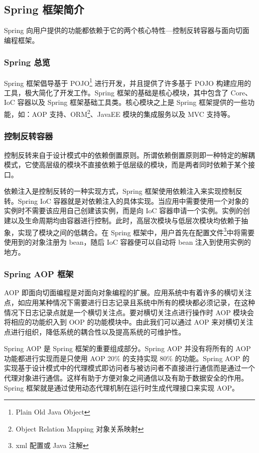 \documentclass[a4paper, 12pt, UTF8]{ctexart}
\begin{document}
	\subsection{Spring 框架简介}
	
	Spring 向用户提供的功能都依赖于它的两个核心特性---控制反转容器与面向切面编程框架。
	
	\subsubsection{Spring 总览}
	Spring 框架倡导基于 POJO\footnote{Plain Old Java Object} 进行开发，并且提供了许多基于 POJO 构建应用的工具，极大简化了开发工作。Spring 框架的基础是核心模块，其中包含了 Core、IoC 容器以及 Spring 框架基础工具类。核心模块之上是 Spring 框架提供的一些功能，如：AOP 支持、ORM\footnote{Object Relation Mapping 对象关系映射}、JavaEE 模块的集成服务以及 MVC 支持等\cite{王福强2009}。
	
	\subsubsection{控制反转容器}
	控制反转来自于设计模式中的依赖倒置原则。所谓依赖倒置原则即一种特定的解耦模式，它使高层级的模块不直接依赖于低层级的模块，而是两者同时依赖于某个接口\cite{Gamma2007}。
	
	依赖注入是控制反转的一种实现方式，Spring 框架使用依赖注入来实现控制反转。Spring IoC 容器就是对依赖注入的具体实现。当应用中需要使用一个对象的实例时不需要该应用自己创建该实例，而是向 IoC 容器申请一个实例。实例的创建以及生命周期均由容器进行控制。此时，高层次模块与低层次模块均依赖于抽象，实现了模块之间的低耦合\cite{Spring2018}。在 Spring 框架中，用户首先在配置文件\footnote{xml 配置或 Java 注解}中将需要使用到的对象注册为 bean，随后 IoC 容器便可以自动将 bean 注入到使用实例的地方。
	
	\subsubsection{Spring AOP 框架}
	AOP 即面向切面编程是对面向对象编程的扩展。应用系统中有着许多的横切关注点，如应用某种情况下需要进行日志记录且系统中所有的模块都必须记录，在这种情况下日志记录点就是一个横切关注点。要对横切关注点进行操作时 AOP 模块会将相应的功能织入到 OOP 的功能模块中。由此我们可以通过 AOP 来对横切关注点进行组织，降低系统的耦合性以及提高系统的可维护性。
	
	Spring AOP 是 Spring 框架的重要组成部分。Spring AOP 并没有将所有的 AOP 功能都进行实现而是只使用 AOP 20\% 的支持实现 80\% 的功能\cite{王福强2009}。Spring AOP 的实现基于设计模式中的代理模式即访问者与被访问者不直接进行通信而是通过一个代理对象进行通信\cite{Gamma2007}。这样有助于方便对象之间通信以及有助于数据安全的作用。Spring 框架就是通过使用动态代理机制在运行时生成代理接口来实现 AOP。
	
\end{document}
